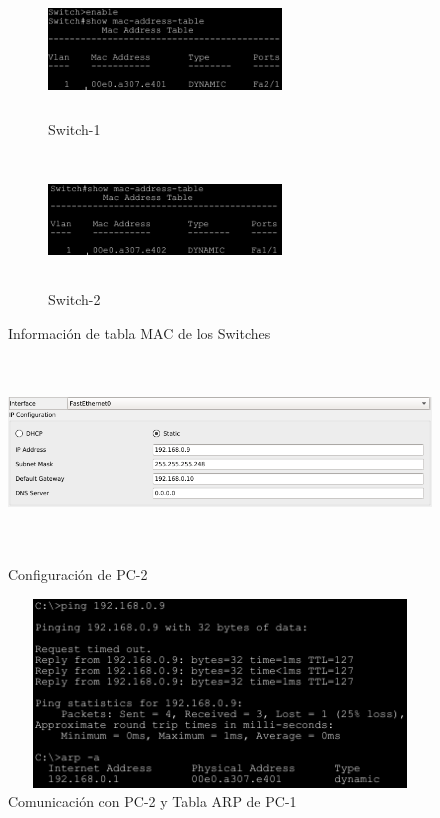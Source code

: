 {\begin{itemize}
\begin{figure}[ht]
                \begin{subfigure}[b]{0.4 \linewidth}
                    \includegraphics[width=6.2cm, height=3.5cm]{imagenes/captura8.png}
                    \caption{Switch-1}
                \end{subfigure}
                \begin{subfigure}[b]{0.4 \linewidth}
                    \includegraphics[width=6.2cm, height=3.5cm]{imagenes/captura9.png}
                    \caption{Switch-2}
                \end{subfigure}
                \caption{Informaci\'on de tabla MAC de los Switches}
            \end{figure}
            \newpage

            \begin{figure}[ht]
                \centering
                \includegraphics[width=12cm, height=5cm]{imagenes/captura10.png}
                \caption{Configuraci\'on de PC-2}
                
                \includegraphics[width=12cm, height=5cm]{imagenes/captura12.png}
                \caption{Comunicaci\'on con PC-2 y Tabla ARP de PC-1}


\end{figure}
\end{itemize}}
